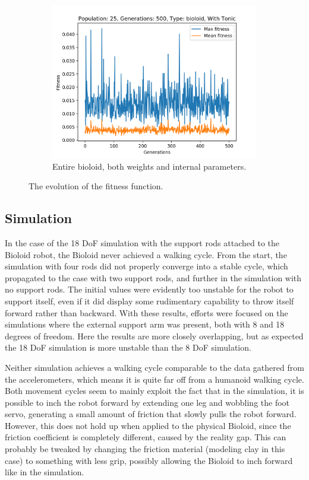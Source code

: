 \begin{figure}[htbp]
\begin{subfigure}[b]{0.5\textwidth}
        \includegraphics[width=1\textwidth]{include/figure/fitness_over_time_pop25_gen500_type1_with.png}
        \caption{Entire bioloid, both weights and internal parameters.}
        \label{fig:fitness_1b}
    \end{subfigure}
    \caption{The evolution of the fitness function.}
    \label{fig:fitness_1}
\end{figure}


\subsection{Simulation}
In the case of the 18 DoF simulation with the support rods attached to the Bioloid robot, the Bioloid never achieved a walking cycle. From the start, the simulation with four rods did not properly converge into a stable cycle, which propagated to the case with two support rods, and further in the simulation with no support rods. The initial values were evidently too unstable for the robot to support itself, even if it did display some rudimentary capability to throw itself forward rather than backward. With these results, efforts were focused on the simulations where the external support arm was present, both with 8 and 18 degrees of freedom. Here the results are more closely overlapping, but as expected the 18 DoF simulation is more unstable than the 8 DoF simulation. 

Neither simulation achieves a walking cycle comparable to the data gathered from the accelerometers, which means it is quite far off from a humanoid walking cycle. Both movement cycles seem to mainly exploit the fact that in the simulation, it is possible to inch the robot forward by extending one leg and wobbling the foot servo, generating a small amount of friction that slowly pulls the robot forward. However, this does not hold up when applied to the physical Bioloid, since the friction coefficient is completely different, caused by the reality gap. This can probably be tweaked by changing the friction material (modeling clay in this case) to something with less grip, possibly allowing the Bioloid to inch forward like in the simulation.
